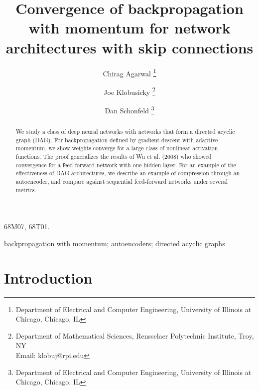 \documentclass{jcmlatex}
\begin{document}

\title{Convergence of backpropagation with momentum for network architectures with skip connections}

\author{Chirag Agarwal
\thanks{Department of Electrical and Computer Engineering, University of Illinois at Chicago, Chicago, IL}
\and
 Joe Klobusicky
\thanks{Department of Mathematical Sciences, Rensselaer Polytechnic Institute, Troy, NY\\ Email: klobuj@rpi.edu}
\and
Dan Schonfeld
\thanks{Department of Electrical and Computer Engineering, University of Illinois at Chicago, Chicago, IL}
}

\maketitle

\begin{abstract}
We study a class of deep neural networks with networks that form a directed acyclic graph (DAG).   For backpropagation defined by gradient descent with adaptive momentum, we show weights converge for a large class of nonlinear activation functions.  The proof generalizes the results of Wu et al. (2008) who showed convergence for a feed forward network with one hidden layer. For an example of the effectiveness of DAG architectures, we describe an example of compression through an autoencoder, and compare against sequential feed-forward networks under several metrics.
\end{abstract}

\begin{classification}
68M07, 68T01.
\end{classification}

\begin{keywords}
backpropagation with momentum; autoencoders; directed acyclic graphs
\end{keywords}

\section{Introduction}\label{sec:introduction}
\end{document}
